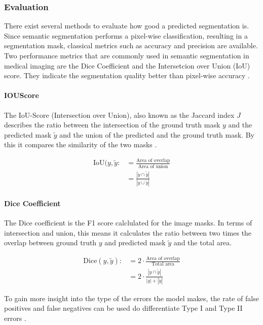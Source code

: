 \subsubsection{Evaluation}

There exist several methods to evaluate how good a predicted segmentation is. Since semantic segmentation performs a pixel-wise classification, resulting in a segmentation mask, classical metrics such as accuracy and precision are available. Two performance metrics that are commonly used in semantic segmentation in medical imaging are the Dice Coefficient and the Intersetcion over Union (IoU) score. They indicate the segmentation quality better than pixel-wise accuracy \cite{Eelbode}.

\paragraph{IOUScore}

The IoU-Score (Intersection over Union), also known as the Jaccard index $J$ describes the ratio between the intersection of the ground truth mask $y$ and the predicted mask $\tilde{y}$ and the union of the predicted and the ground truth mask. By this it compares the similarity of the two masks \cite{Cho2021WeightedIO}.

\begin{align}
	\text{IoU}(y, \tilde{y} :&= \frac{\text{Area of overlap}}{\text{Area of union}}\\
	&=\frac{|y \cap \tilde{y}|}{|y \cup \tilde {y}|}
\end{align}


\paragraph{Dice Coefficient}

The Dice coefficient is the F1 score calclulated for the image masks. In terms of intersection and union, this means it calculates the ratio between two times the overlap between ground truth $y$ and predicted mask $\tilde{y}$ and the total area.

\begin{align}
	\text{Dice}(y, \tilde{y}) :&= 2 \cdot \frac{\text{Area of overlap}}{\text{Total area}}\\
	&= 2 \cdot \frac{|y \cap \tilde{y}|}{|y| + |\tilde{y}|}
\end{align}

To gain more insight into the type of the errors the model makes, the rate of false positives and false negatives can be used do differentiate Type I and Type II errors \cite{DFUC2022}.

